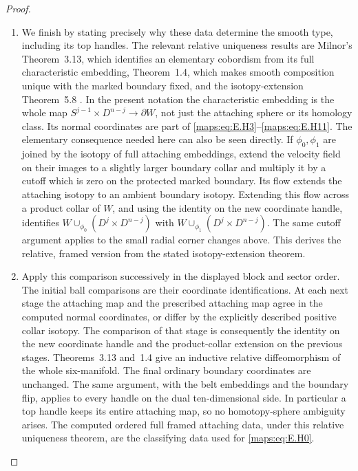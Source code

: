 \begin{proof}
\begin{enumerate}[label={$\langle1\rangle$\arabic*.},leftmargin=*]
\item We finish by stating precisely why these data determine the smooth
type, including its top handles.  The relevant relative uniqueness
results are Milnor's Theorem~3.13, which identifies an elementary
cobordism from its full characteristic embedding, Theorem~1.4,
which makes smooth composition unique with the marked boundary
fixed, and the isotopy-extension Theorem~5.8
\cite{mapsMilnor65}.  In the present notation the characteristic
embedding is the whole map
$S^{j-1}\times D^{n-j}\longrightarrow\partial W$, not just
the attaching sphere or its homology class.  Its normal coordinates
are part of \eqref{maps:eq:E.H3}--\eqref{maps:eq:E.H11}.  The elementary consequence needed
here can also be seen directly.  If $\phi_0,\phi_1$ are joined
by the isotopy of full attaching embeddings, extend
the velocity field on their images to a slightly larger boundary
collar and multiply it by a cutoff which is zero on the protected
marked boundary.  Its flow extends the attaching isotopy to an
ambient boundary isotopy.  Extending this flow across a product
collar of $W$, and using the identity on the new coordinate handle,
identifies $W\cup_{\phi_0}(D^j\times D^{n-j})$ with
$W\cup_{\phi_1}(D^j\times D^{n-j})$.  The same cutoff argument
applies to the small radial corner changes above.  This derives
the relative, framed version from the stated isotopy-extension
theorem.

\item Apply this comparison successively in the displayed block and
sector order.  The initial ball comparisons are their coordinate
identifications.  At each next stage the attaching map
and the prescribed attaching map agree in the computed normal
coordinates, or differ by the explicitly described positive
collar isotopy.  The comparison of that stage is consequently
the identity on the new coordinate handle and the product-collar
extension on the previous stages.  Theorems~3.13 and~1.4 give an
inductive relative diffeomorphism of the whole six-manifold.
The final ordinary boundary coordinates are unchanged.  The
same argument, with the belt embeddings and the boundary flip, applies to every handle on the dual ten-dimensional
side.  In particular a top handle keeps its entire attaching map, so no homotopy-sphere ambiguity arises.  The computed
ordered full framed attaching data, under this relative uniqueness
theorem, are the classifying data used for \eqref{maps:eq:E.H0}.
\end{enumerate}
\end{proof}

\clearpage
